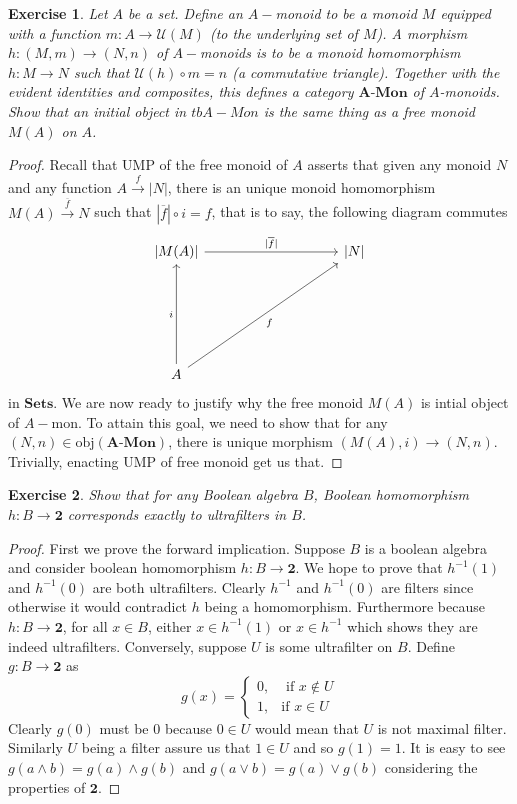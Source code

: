 \documentclass[a4paper, 11pt]{book}
\theoremstyle{plain}
\newtheorem{exercise}{Exercise}[chapter]
\theoremstyle{plain}
\newcommand{\mb}{\mathbf}
\newcommand{\arr}{\rightarrow}
\newcommand{\U}{\mathcal{U}}
\newcommand{\obj}{\text{obj}}
\newcommand{\warr}{\xrightarrow}
\newcommand{\tb}{\textbf}
\newcommand{\ovl}{\overline}
\begin{document}
  \begin{exercise}
    Let $A$ be a set. Define an $A-$monoid to be a monoid $M$ equipped with a function $m:A \arr \U(M)$ (to the underlying set of $M$). A morphism $h:(M,m) \arr (N, n)$ of $A-$monoids is to be a monoid homomorphism $h: M \arr N$ such that $\U(h) \circ m=n$ (a commutative triangle). Together with the evident identities and composites, this defines a category $\tb{A-Mon}$ of $A$-monoids. \\
    Show that an initial object in $tb{A-Mon}$ is the same thing as a free monoid $M(A)$ on $A$.
  \end{exercise}
  \begin{proof}
    Recall that UMP of the free monoid of $A$ asserts that given any monoid $N$ and any function $A \warr{f} |N|$, there is an unique monoid homomorphism $M(A) \warr{\ovl{f}} N$ such that $|\ovl{f}| \circ i=f$, that is to say, the following diagram commutes 
    \[\begin{tikzcd}
      {|M(A)|} &&&& {|N|} \\
      \\
      \\
      \\
      A
      \arrow["i", from=5-1, to=1-1]
      \arrow["f"', from=5-1, to=1-5]
      \arrow["{|\overline{f}|}", from=1-1, to=1-5]
    \end{tikzcd}\]
    in $\mb{Sets}$. We are now ready to justify why the free monoid $M(A)$ is intial object of $A-$mon. To attain this goal, we need to show that for any $(N,n) \in \obj(\tb{A-Mon})$, there is unique morphism $(M(A), i) \arr (N,n)$. Trivially, enacting UMP of free monoid get us that.
  \end{proof}

  \begin{exercise}
    Show that for any Boolean algebra $B$, Boolean homomorphism $h:B \arr \mb{2}$ corresponds exactly to ultrafilters in $B$.
  \end{exercise}
  \begin{proof}
    First we prove the forward implication. Suppose $B$ is a boolean algebra and consider boolean homomorphism $h:B \arr \mb{2}$. We hope to prove that $h^{-1}(1)$ and $h^{-1}(0)$ are both ultrafilters. Clearly $h^{-1}$ and $h^{-1}(0)$ are filters since otherwise it would contradict $h$ being a homomorphism. Furthermore because $h:B \arr \mb{2}$, for all $x \in B$, either $x \in h^{-1}(1)$ or $x \in h^{-1}$ which shows they are indeed ultrafilters. Conversely, suppose $U$ is some ultrafilter on $B$. Define $g:B \arr \mb{2}$ as $$g(x)= \begin{cases}
      0, & \text{ if $x \notin U$} \\
      1, & \text{if $x \in U$}
    \end{cases}$$
    Clearly $g(0)$ must be $0$ because $0 \in U$ would mean that $U$ is not maximal filter. Similarly $U$ being a filter assure us that $1 \in U$ and so $g(1)=1$. It is easy to see $g(a \land b)=g(a) \land g(b)$ and $g(a \lor b)=g(a) \lor g(b)$ considering the properties of $\mb{2}$.
  \end{proof}
\end{document}
